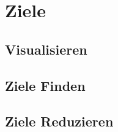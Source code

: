 \section{Ziele}

\subsection{Visualisieren}

\subsection{Ziele Finden}

\subsection{Ziele Reduzieren}



